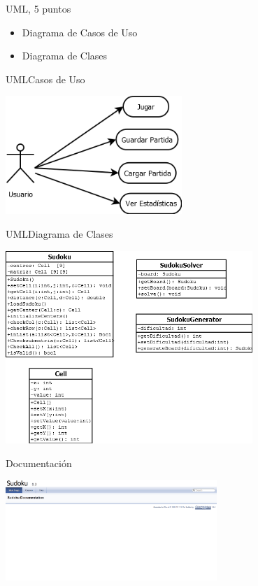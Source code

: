 \documentclass[9pt]{beamer}
\begin{document}
	\begin{frame}{UML, 5 puntos}
		\begin{itemize}
			\item Diagrama de Casos de Uso
			\item Diagrama de Clases
		\end{itemize}
	\end{frame}
	\begin{frame}{UML}{Casos de Uso}
		\begin{center}
			\includegraphics[width = 0.5\textwidth]{CasoDeUsos.png}
		\end{center}
	\end{frame}
	\begin{frame}{UML}{Diagrama de Clases}
		\begin{center}
			\includegraphics[width=0.7\textwidth]{clases.png}
		\end{center}
	\end{frame}
	
	\begin{frame}{Documentación}
		\begin{center}
			\includegraphics[width =0.60\textwidth]{doc.png}
		\end{center}
	\end{frame}
\end{document}
